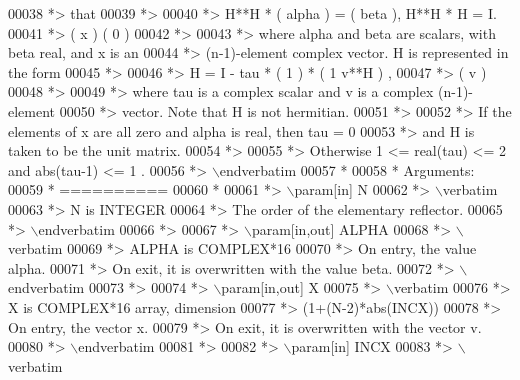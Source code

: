 \begin{DoxyCode}
00038 \textcolor{comment}{*> that}
00039 \textcolor{comment}{*>}
00040 \textcolor{comment}{*>       H**H * ( alpha ) = ( beta ),   H**H * H = I.}
00041 \textcolor{comment}{*>              (   x   )   (   0  )}
00042 \textcolor{comment}{*>}
00043 \textcolor{comment}{*> where alpha and beta are scalars, with beta real, and x is an}
00044 \textcolor{comment}{*> (n-1)-element complex vector. H is represented in the form}
00045 \textcolor{comment}{*>}
00046 \textcolor{comment}{*>       H = I - tau * ( 1 ) * ( 1 v**H ) ,}
00047 \textcolor{comment}{*>                     ( v )}
00048 \textcolor{comment}{*>}
00049 \textcolor{comment}{*> where tau is a complex scalar and v is a complex (n-1)-element}
00050 \textcolor{comment}{*> vector. Note that H is not hermitian.}
00051 \textcolor{comment}{*>}
00052 \textcolor{comment}{*> If the elements of x are all zero and alpha is real, then tau = 0}
00053 \textcolor{comment}{*> and H is taken to be the unit matrix.}
00054 \textcolor{comment}{*>}
00055 \textcolor{comment}{*> Otherwise  1 <= real(tau) <= 2  and  abs(tau-1) <= 1 .}
00056 \textcolor{comment}{*> \(\backslash\)endverbatim}
00057 \textcolor{comment}{*}
00058 \textcolor{comment}{*  Arguments:}
00059 \textcolor{comment}{*  ==========}
00060 \textcolor{comment}{*}
00061 \textcolor{comment}{*> \(\backslash\)param[in] N}
00062 \textcolor{comment}{*> \(\backslash\)verbatim}
00063 \textcolor{comment}{*>          N is INTEGER}
00064 \textcolor{comment}{*>          The order of the elementary reflector.}
00065 \textcolor{comment}{*> \(\backslash\)endverbatim}
00066 \textcolor{comment}{*>}
00067 \textcolor{comment}{*> \(\backslash\)param[in,out] ALPHA}
00068 \textcolor{comment}{*> \(\backslash\)verbatim}
00069 \textcolor{comment}{*>          ALPHA is COMPLEX*16}
00070 \textcolor{comment}{*>          On entry, the value alpha.}
00071 \textcolor{comment}{*>          On exit, it is overwritten with the value beta.}
00072 \textcolor{comment}{*> \(\backslash\)endverbatim}
00073 \textcolor{comment}{*>}
00074 \textcolor{comment}{*> \(\backslash\)param[in,out] X}
00075 \textcolor{comment}{*> \(\backslash\)verbatim}
00076 \textcolor{comment}{*>          X is COMPLEX*16 array, dimension}
00077 \textcolor{comment}{*>                         (1+(N-2)*abs(INCX))}
00078 \textcolor{comment}{*>          On entry, the vector x.}
00079 \textcolor{comment}{*>          On exit, it is overwritten with the vector v.}
00080 \textcolor{comment}{*> \(\backslash\)endverbatim}
00081 \textcolor{comment}{*>}
00082 \textcolor{comment}{*> \(\backslash\)param[in] INCX}
00083 \textcolor{comment}{*> \(\backslash\)verbatim}

\end{DoxyCode}
